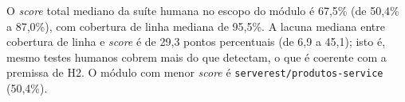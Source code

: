 O \textit{score} total mediano da suíte humana no escopo do módulo é 67,5\% (de 50,4\% a 87,0\%), com cobertura de linha mediana de 95,5\%. A lacuna mediana entre cobertura de linha e \textit{score} é de 29,3 pontos percentuais (de 6,9 a 45,1); isto é, mesmo testes humanos cobrem mais do que detectam, o que é coerente com a premissa de H2. O módulo com menor \textit{score} é \texttt{serverest/produtos-service} (50,4\%).

